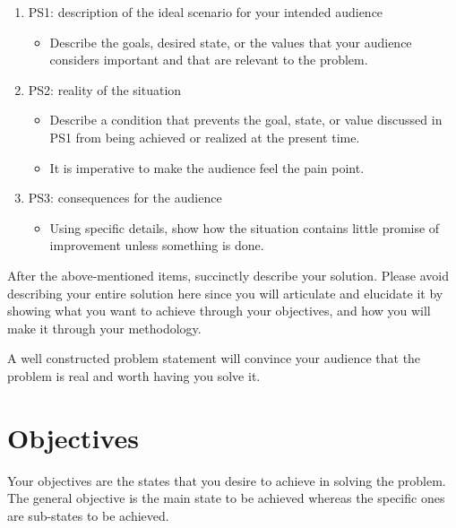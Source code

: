 \begin{enumerate}
	\item PS1: description of the ideal scenario for your intended audience
	\begin{itemize}
		\item Describe the goals, desired state, or the values that your audience considers important and that are relevant to the problem.
	\end{itemize}

	\item PS2:  reality of the situation
	\begin{itemize}
			\item Describe a condition that prevents the goal, state, or value discussed in PS1 from being achieved or realized at the present time.
			\item It is imperative to make the audience feel the pain point.
	\end{itemize}

	\item PS3:  consequences for the audience
	\begin{itemize}
			\item Using specific details, show how the situation contains little promise of improvement unless something is done.
	\end{itemize}

\end{enumerate}

\noindent After the above-mentioned items, succinctly describe your solution.  Please avoid describing your entire solution here since you will articulate and elucidate it by showing what you want to achieve through your objectives, and how you will make it through your methodology.

\noindent A well constructed problem statement will convince your audience that the problem is real and worth having you solve it.



\graytx{\blindtext}



\section{Objectives}

Your objectives are the states that you desire to achieve in solving the problem. The general objective is the main state to be achieved whereas the specific ones are sub-states to be achieved.

